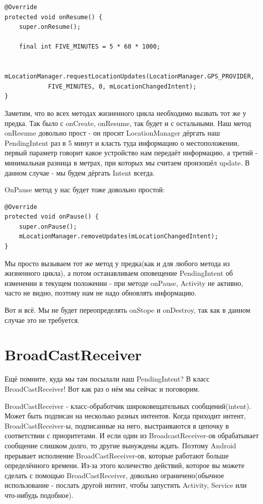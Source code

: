 \documentclass[12 pt]{article}
\begin{document}
     \begin{lstlisting}
@Override
protected void onResume() {
    super.onResume();

    final int FIVE_MINUTES = 5 * 60 * 1000;

    mLocationManager.requestLocationUpdates(LocationManager.GPS_PROVIDER,
            FIVE_MINUTES, 0, mLocationChangedIntent);
}    
     \end{lstlisting}
    
    Заметим, что во всех методах жизненного цикла необходимо вызвать тот же у предка. Так было с onCreate, onResume, так будет и с остальными. Наш метод onResume довольно прост - он просит LocationManager дёргать наш PendingIntent раз в 5 минут и класть туда информацию о местоположении, первый параметр говорит какое устройство нам передаёт информацию, а третий - минимальная разница в метрах, при которых мы считаем произошёл update. В данном случае - мы будем дёргать Intent всегда.
    
    OnPause метод у нас будет тоже довольно простой:
    \begin{lstlisting}
@Override
protected void onPause() {
    super.onPause();
    mLocationManager.removeUpdates(mLocationChangedIntent);
} 
    \end{lstlisting}
    
    Мы просто вызываем тот же метод у предка(как и для любого метода из жизненного цикла), а потом останавливаем оповещение PendingIntent об изменении в текущем положении - при методе onPause, Activity не активно, часто не видно, поэтому нам не надо обновлять информацию.
    
    Вот и всё. Мы не будет переопределять onStope и onDestroy, так как в данном случае это не требуется.
\section{BroadCastReceiver} 
    Ещё помните, куда мы там посылали наш PendingIntent? В класс BroadCastReceiver! Вот как раз о нём мы сейчас и поговорим.
    
    BroadCastReceiver - класс-обработчик широковещательных сообщений(intent). Может быть подписан на несколько разных интентов. Когда приходит интент, BroadCastReceiver-ы, подписанные на него, выстраиваются в цепочку в соответствии с приоритетами. И если один из BroadcastReceiver-ов обрабатывает сообщение слишком долго, то другие вынуждены ждать. Поэтому Android прерывает исполнение BroadCastReceiver-ов, которые работают больше определённого времени. Из-за этого количество действий, которое вы можете сделать с помощью BroadCastReceiver, довольно ограничено(обычное использование - послать другой интент, чтобы запустить Activity, Service или что-нибудь подобное).
    
\end{document}
